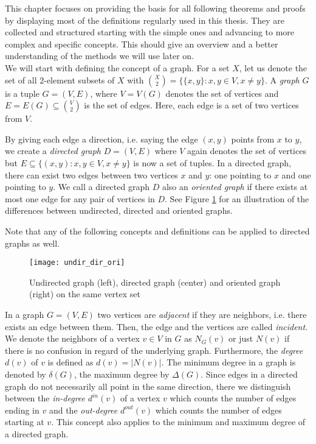 This chapter focuses on providing the basis for all following theorems and proofs by displaying most of the definitions regularly used in this thesis. They are collected and structured starting with the simple ones and advancing to more complex and specific concepts. This should give an overview and a better understanding of the methods we will use later on.\\

We will start with defining the concept of a graph. For a set $X$, let us denote the set of all $2$-element subsets of $X$ with ${X\choose 2} =\lbrace \lbrace x,y\rbrace : x,y\in V, x\neq y\rbrace$. A \textit{graph} $G$ is a tuple $G=(V,E)$, where $V=V(G)$ denotes the set of vertices and $E=E(G)\subseteq {V\choose 2}$ is the set of edges. Here, each edge is a set of two vertices from $V$.

By giving each edge a direction, i.e. saying the edge $(x,y)$ points from $x$ to $y$, we create a \textit{directed graph} $D=(V,E)$ where $V$ again denotes the set of vertices but $E\subseteq \lbrace (x,y) : x,y\in V, x\neq y\rbrace$ is now a set of tuples. In a directed graph, there can exist two edges between two vertices $x$ and $y$: one pointing to $x$ and one pointing to $y$. We call a directed graph $D$ also an \textit{oriented graph} if there exists at most one edge for any pair of vertices in $D$. See Figure \ref{f1ba} for an illustration of the differences between undirected, directed and oriented graphs. 

Note that any of the following concepts and definitions can be applied to directed graphs as well.

\begin{figure}[ht]
\begin{center}
\texttt{[image: undir\_dir\_ori]}
\end{center}
\caption{Undirected graph (left), directed graph (center) and oriented graph (right) on the same vertex set}
\label{f1ba}
\end{figure}

In a graph $G=(V,E)$ two vertices are \textit{adjacent} if they are neighbors, i.e. there exists an edge between them. Then, the edge and the vertices are called \textit{incident}. We denote the neighbors of a vertex $v\in V$ in $G$ as $N_G(v)$ or just $N(v)$ if there is no confusion in regard of the underlying graph. Furthermore, the \textit{degree} $d(v)$ of $v$ is defined as $d(v) =\vert N(v)\vert$. The minimum degree in a graph is denoted by $\delta (G)$, the maximum degree by $\Delta (G)$. Since edges in a directed graph do not necessarily all point in the same direction, there we distinguish between the \textit{in-degree} $d^{in}(v)$ of a vertex $v$ which counts the number of edges ending in $v$ and the \textit{out-degree} $d^{out}(v)$ which counts the number of edges starting at $v$. This concept also applies to the minimum and maximum degree of a directed graph.\\

